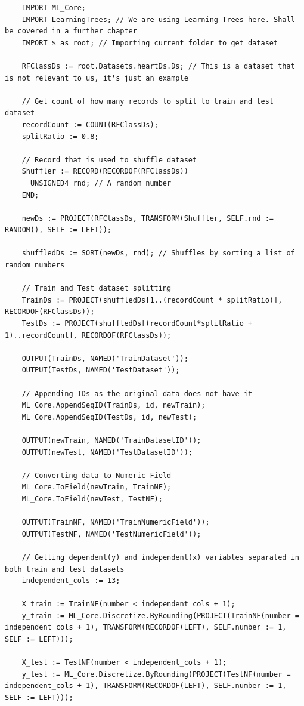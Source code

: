 \documentclass[a4paper,oneside,12pt]{book}
\begin{document}
\begin{lstlisting}
    IMPORT ML_Core;
    IMPORT LearningTrees; // We are using Learning Trees here. Shall be covered in a further chapter
    IMPORT $ as root; // Importing current folder to get dataset
    
    RFClassDs := root.Datasets.heartDs.Ds; // This is a dataset that is not relevant to us, it's just an example
    
    // Get count of how many records to split to train and test dataset
    recordCount := COUNT(RFClassDs);
    splitRatio := 0.8;
    
    // Record that is used to shuffle dataset
    Shuffler := RECORD(RECORDOF(RFClassDs))
      UNSIGNED4 rnd; // A random number
    END;
    
    newDs := PROJECT(RFClassDs, TRANSFORM(Shuffler, SELF.rnd := RANDOM(), SELF := LEFT)); 
    
    shuffledDs := SORT(newDs, rnd); // Shuffles by sorting a list of random numbers
    
    // Train and Test dataset splitting
    TrainDs := PROJECT(shuffledDs[1..(recordCount * splitRatio)], RECORDOF(RFClassDs));
    TestDs := PROJECT(shuffledDs[(recordCount*splitRatio + 1)..recordCount], RECORDOF(RFClassDs));
    
    OUTPUT(TrainDs, NAMED('TrainDataset'));
    OUTPUT(TestDs, NAMED('TestDataset'));
    
    // Appending IDs as the original data does not have it
    ML_Core.AppendSeqID(TrainDs, id, newTrain);
    ML_Core.AppendSeqID(TestDs, id, newTest);
    
    OUTPUT(newTrain, NAMED('TrainDatasetID'));
    OUTPUT(newTest, NAMED('TestDatasetID'));
    
    // Converting data to Numeric Field
    ML_Core.ToField(newTrain, TrainNF);
    ML_Core.ToField(newTest, TestNF);
    
    OUTPUT(TrainNF, NAMED('TrainNumericField'));
    OUTPUT(TestNF, NAMED('TestNumericField'));
    
    // Getting dependent(y) and independent(x) variables separated in both train and test datasets
    independent_cols := 13;
    
    X_train := TrainNF(number < independent_cols + 1);
    y_train := ML_Core.Discretize.ByRounding(PROJECT(TrainNF(number = independent_cols + 1), TRANSFORM(RECORDOF(LEFT), SELF.number := 1, SELF := LEFT)));
    
    X_test := TestNF(number < independent_cols + 1);
    y_test := ML_Core.Discretize.ByRounding(PROJECT(TestNF(number = independent_cols + 1), TRANSFORM(RECORDOF(LEFT), SELF.number := 1, SELF := LEFT)));
    

\end{lstlisting}
\end{document}
